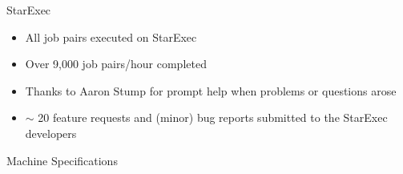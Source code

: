 \documentclass{beamer}
\begin{document}

\begin{frame}{StarExec}
  \begin{itemize}
  \item All job pairs executed on StarExec
  \item Over 9,000 job pairs/hour completed
  \end{itemize}

  \medskip
  
  \begin{center}
    {\Large{}}
  \end{center}

  \medskip
  
  \begin{itemize}
  \item Thanks to Aaron Stump for prompt help when problems or
    questions arose
  \item $\sim$ 20 feature requests and (minor) bug reports submitted
    to the StarExec developers
  \end{itemize}
\end{frame}


\begin{frame}{Machine Specifications}

\end{frame}

\end{document}
